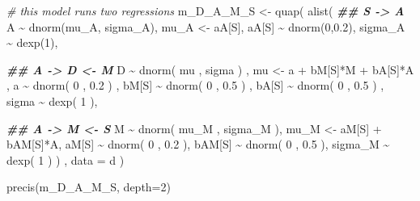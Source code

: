 \documentclass[
]{article}
\newenvironment{Shaded}{\begin{snugshade}}{\end{snugshade}}
\newcommand{\AttributeTok}[1]{\textcolor[rgb]{0.77,0.63,0.00}{#1}}
\newcommand{\CommentTok}[1]{\textcolor[rgb]{0.56,0.35,0.01}{\textit{#1}}}
\newcommand{\DecValTok}[1]{\textcolor[rgb]{0.00,0.00,0.81}{#1}}
\newcommand{\DocumentationTok}[1]{\textcolor[rgb]{0.56,0.35,0.01}{\textbf{\textit{#1}}}}
\newcommand{\FloatTok}[1]{\textcolor[rgb]{0.00,0.00,0.81}{#1}}
\newcommand{\FunctionTok}[1]{\textcolor[rgb]{0.00,0.00,0.00}{#1}}
\newcommand{\NormalTok}[1]{#1}
\newcommand{\OtherTok}[1]{\textcolor[rgb]{0.56,0.35,0.01}{#1}}
\newcommand{\SpecialCharTok}[1]{\textcolor[rgb]{0.00,0.00,0.00}{#1}}
\begin{document}
\begin{Shaded}
\begin{Highlighting}[]
\CommentTok{\# this model runs two regressions}
\NormalTok{m\_D\_A\_M\_S }\OtherTok{\textless{}{-}} \FunctionTok{quap}\NormalTok{(}
  \FunctionTok{alist}\NormalTok{(}
    \DocumentationTok{\#\# S {-}\textgreater{} A }
\NormalTok{    A }\SpecialCharTok{\textasciitilde{}} \FunctionTok{dnorm}\NormalTok{(mu\_A, sigma\_A),}
\NormalTok{    mu\_A }\OtherTok{\textless{}{-}}\NormalTok{ aA[S],}
\NormalTok{    aA[S] }\SpecialCharTok{\textasciitilde{}} \FunctionTok{dnorm}\NormalTok{(}\DecValTok{0}\NormalTok{,}\FloatTok{0.2}\NormalTok{),}
\NormalTok{    sigma\_A }\SpecialCharTok{\textasciitilde{}} \FunctionTok{dexp}\NormalTok{(}\DecValTok{1}\NormalTok{),}
    
    \DocumentationTok{\#\# A {-}\textgreater{} D \textless{}{-} M}
\NormalTok{    D }\SpecialCharTok{\textasciitilde{}} \FunctionTok{dnorm}\NormalTok{( mu , sigma ) ,}
\NormalTok{    mu }\OtherTok{\textless{}{-}}\NormalTok{ a }\SpecialCharTok{+}\NormalTok{ bM[S]}\SpecialCharTok{*}\NormalTok{M }\SpecialCharTok{+}\NormalTok{ bA[S]}\SpecialCharTok{*}\NormalTok{A ,}
\NormalTok{    a }\SpecialCharTok{\textasciitilde{}} \FunctionTok{dnorm}\NormalTok{( }\DecValTok{0}\NormalTok{ , }\FloatTok{0.2}\NormalTok{ ) ,}
\NormalTok{    bM[S] }\SpecialCharTok{\textasciitilde{}} \FunctionTok{dnorm}\NormalTok{( }\DecValTok{0}\NormalTok{ , }\FloatTok{0.5}\NormalTok{ ) ,}
\NormalTok{    bA[S] }\SpecialCharTok{\textasciitilde{}} \FunctionTok{dnorm}\NormalTok{( }\DecValTok{0}\NormalTok{ , }\FloatTok{0.5}\NormalTok{ ) ,}
\NormalTok{    sigma }\SpecialCharTok{\textasciitilde{}} \FunctionTok{dexp}\NormalTok{( }\DecValTok{1}\NormalTok{ ),}
    
    \DocumentationTok{\#\# A {-}\textgreater{} M \textless{}{-} S}
\NormalTok{    M }\SpecialCharTok{\textasciitilde{}} \FunctionTok{dnorm}\NormalTok{( mu\_M , sigma\_M ),}
\NormalTok{    mu\_M }\OtherTok{\textless{}{-}}\NormalTok{ aM[S] }\SpecialCharTok{+}\NormalTok{ bAM[S]}\SpecialCharTok{*}\NormalTok{A,}
\NormalTok{    aM[S] }\SpecialCharTok{\textasciitilde{}} \FunctionTok{dnorm}\NormalTok{( }\DecValTok{0}\NormalTok{ , }\FloatTok{0.2}\NormalTok{ ),}
\NormalTok{    bAM[S] }\SpecialCharTok{\textasciitilde{}} \FunctionTok{dnorm}\NormalTok{( }\DecValTok{0}\NormalTok{ , }\FloatTok{0.5}\NormalTok{ ),}
\NormalTok{    sigma\_M }\SpecialCharTok{\textasciitilde{}} \FunctionTok{dexp}\NormalTok{( }\DecValTok{1}\NormalTok{ )}
\NormalTok{    ) , }\AttributeTok{data =}\NormalTok{ d )}

\FunctionTok{precis}\NormalTok{(m\_D\_A\_M\_S, }\AttributeTok{depth=}\DecValTok{2}\NormalTok{)}
\end{Highlighting}
\end{Shaded}
\end{document}
